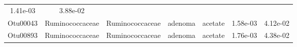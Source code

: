 \documentclass[11pt,]{article}
\begin{document}
\begin{longtable}[]{@{}ccccccc@{}}
\begin{minipage}[t]{0.09\columnwidth}
1.41e-03\strut
\end{minipage} & \begin{minipage}[t]{0.09\columnwidth}\centering\strut
3.88e-02\strut
\end{minipage}\tabularnewline
\begin{minipage}[t]{0.09\columnwidth}\centering\strut
Otu00043\strut
\end{minipage} & \begin{minipage}[t]{0.17\columnwidth}\centering\strut
Ruminococcaceae\strut
\end{minipage} & \begin{minipage}[t]{0.17\columnwidth}\centering\strut
Ruminococcaceae\strut
\end{minipage} & \begin{minipage}[t]{0.09\columnwidth}\centering\strut
adenoma\strut
\end{minipage} & \begin{minipage}[t]{0.11\columnwidth}\centering\strut
acetate\strut
\end{minipage} & \begin{minipage}[t]{0.09\columnwidth}\centering\strut
1.58e-03\strut
\end{minipage} & \begin{minipage}[t]{0.09\columnwidth}\centering\strut
4.12e-02\strut
\end{minipage}\tabularnewline
\begin{minipage}[t]{0.09\columnwidth}\centering\strut
Otu00893\strut
\end{minipage} & \begin{minipage}[t]{0.17\columnwidth}\centering\strut
Ruminococcaceae\strut
\end{minipage} & \begin{minipage}[t]{0.17\columnwidth}\centering\strut
Ruminococcaceae\strut
\end{minipage} & \begin{minipage}[t]{0.09\columnwidth}\centering\strut
adenoma\strut
\end{minipage} & \begin{minipage}[t]{0.11\columnwidth}\centering\strut
acetate\strut
\end{minipage} & \begin{minipage}[t]{0.09\columnwidth}\centering\strut
1.76e-03\strut
\end{minipage} & \begin{minipage}[t]{0.09\columnwidth}\centering\strut
4.38e-02\strut
\end{minipage}\tabularnewline

\end{longtable}
\end{document}
